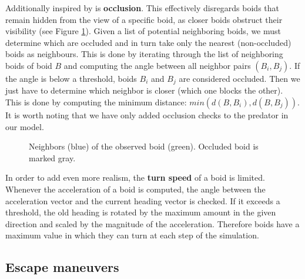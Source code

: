 \documentclass[9pt]{pnas-new}
\begin{document}
Additionally inspired by \cite{JDemsar_predator_attacks} is \textbf{occlusion}.
This effectively disregards boids that remain hidden from the view of a specific boid, as closer
boids obstruct their visibility (see Figure \ref{fig:occlusion}). Given a list of potential neighboring boids,
we must determine which are occluded and in turn take only the nearest (non-occluded) boids as neighbours. 
This is done by iterating through the list of neighboring boids of boid $B$ and computing the angle between all
neighbor pairs $(B_i, B_j)$. If the angle is below a threshold, boids $B_i$ and $B_j$ are considered occluded.
Then we just have to determine which neighbor is closer (which one blocks the other). This is done by computing
the minimum distance: $min(d(B, B_i), d(B, B_j))$. It is worth noting that we have only added occlusion
checks to the predator in our model.
\begin{figure}[h]
    \centering
	\caption{Neighbors (blue) of the observed boid (green). Occluded boid is marked gray.}
	\label{fig:occlusion}
\end{figure}

In order to add even more realism, the \textbf{turn speed} of a boid is limited.
Whenever the acceleration of a boid is computed, the angle between the acceleration vector and the current heading vector is checked.
If it exceeds a threshold, the old heading is rotated by the maximum amount in the given direction and scaled by the magnitude of the acceleration.
Therefore boids have a maximum value in which they can turn at each step of the simulation.

\subsection*{Escape maneuvers}
\end{document}
